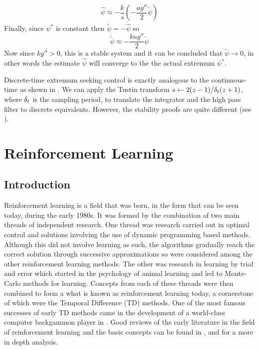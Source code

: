 \begin{equation*}
\hat\psi \approx -\frac{k}{s}\left( -\frac{ag''}{2}\tilde\psi \right)
\end{equation*}
Finally, since $\psi^*$ is constant then $\dot{\tilde\psi} = -\dot{\hat\psi}$ so
\begin{equation*}
\dot{\tilde\psi} \approx -\frac{kag''}{2}\tilde\psi
\end{equation*}
Now since $kg''>0$, this is a stable system and it can be concluded that $\tilde\psi \rightarrow 0$, in other words the estimate $\hat\psi$ will converge to the the actual extremum $\psi^*$.


Discrete-time extremum seeking control is exactly analogous to the continuous-time as shown in . We can apply the Tustin transform $s \leftarrow 2(z-1)/\delta_t(z+1)$, where $\delta_t$ is the sampling period, to translate the integrator and the high pass filter to discrete equivalents. However, the stability proofs are quite different (see \cite{CKAL02}).








\section{Reinforcement Learning} %
\subsection{Introduction}
Reinforcement learning is a field that was born, in the form that can be seen today, during the early 1980s. It was formed by the combination of two main threads of independent research. One thread was research carried out in optimal control and solutions involving the use of dynamic programming based methods. Although this did not involve learning as such, the algorithms gradually reach the correct solution through successive approximations so were considered among the other reinforcement learning methods. The other was research in learning by trial and error which started in the psychology of animal learning and led to Monte-Carlo methods for learning. Concepts from each of these threads were then combined to form a what is known as reinforcement learning today, a cornerstone of which were the Temporal Difference (TD) methods. One of the most famous successes of early TD methods came in the development of a world-class computer backgammon player in \cite{Tes92,Tes95}. Good reviews of the early literature in the field of reinforcement learning and the basic concepts can be found in \cite{SuBa98}, \cite{KLM96} and \cite{BerTs96} for a more in depth analysis.


